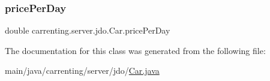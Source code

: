 \mbox{\label{classcarrenting_1_1server_1_1jdo_1_1_car_aa583f558d71242bee5e30c610beb50dd}} 
\subsubsection{\texorpdfstring{pricePerDay}{pricePerDay}}
{\footnotesize\ttfamily double carrenting.\+server.\+jdo.\+Car.\+price\+Per\+Day\hspace{0.3cm}{\ttfamily [protected]}}



The documentation for this class was generated from the following file\+:\begin{DoxyCompactItemize}
\item 
main/java/carrenting/server/jdo/\mbox{\hyperlink{_car_8java}{Car.\+java}}\end{DoxyCompactItemize}

